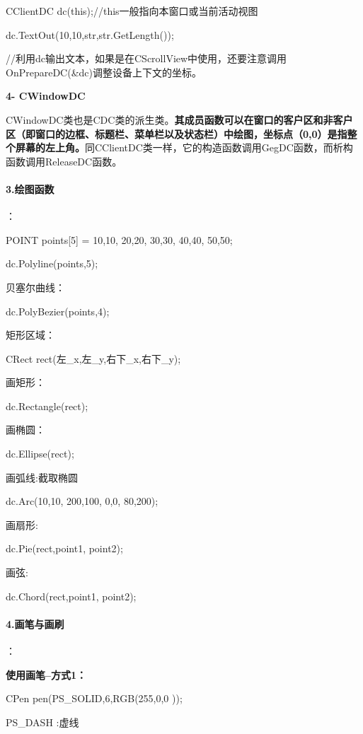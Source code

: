 \documentclass[UTF8,a4paper,8pt]{ctexart}
\begin{document}
		       CClientDC dc(this);//this一般指向本窗口或当前活动视图
		  
		       dc.TextOut(10,10,str,str.GetLength());
		  
			  //利用dc输出文本，如果是在CScrollView中使用，还要注意调用OnPrepareDC(\&dc)调整设备上下文的坐标。
		  
		    \textbf{4- CWindowDC}
		     
		     CWindowDC类也是CDC类的派生类。\textbf{其成员函数可以在窗口的客户区和非客户区（即窗口的边框、标题栏、菜单栏以及状态栏）中绘图，坐标点（0,0）是指整个屏幕的左上角。}同CClientDC类一样，它的构造函数调用GegDC函数，而析构函数调用ReleaseDC函数。
	     
	     \paragraph{3.绘图函数}：
	     
		     POINT points[5] = {10,10,  20,20,  30,30,  40,40,  50,50};
		     
		     dc.Polyline(points,5);
		     
		     贝塞尔曲线：
		     
		     dc.PolyBezier(points,4);
		     
		     矩形区域：
		     
		     CRect rect(左\_x,左\_y,右下\_x,右下\_y);
		     
		     画矩形：
		     
		     dc.Rectangle(rect);
		     
		     画椭圆：
		     
		     dc.Ellipse(rect);
		     
		     画弧线:截取椭圆
		     
		     dc.Arc(10,10,  200,100, 0,0,  80,200);
		     
		     画扇形:
		     
		     dc.Pie(rect,point1, point2);
		     
		     画弦:
		     
		     dc.Chord(rect,point1, point2);
	     \paragraph{4.画笔与画刷}：
	     
		\textbf{使用画笔--方式1：}
		     
		     CPen pen(PS\_SOLID,6,RGB(255,0,0 ));
		     
		     PS\_DASH :虚线
		     
\end{document}
